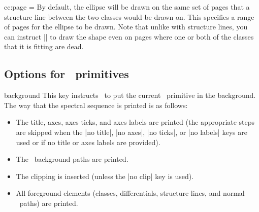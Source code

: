 \begin{sseqdata}[name = basic, cohomological Serre grading]
\begin{key}{cc:page = }%
By default, the ellipse will be drawn on the same set of pages that a structure
line between the two classes would be drawn on. This specifies a range of pages
for the ellipse to be drawn. Note that unlike with structure lines, you can
instruct |\circleclasses| to draw the shape even on pages where one or both of
the classes that it is fitting are dead.
\end{key}

\subsection{Options for \tikzpkg\  primitives}
\begin{key}{background}%
This key instructs \sseqpages\  to put the current \tikzpkg\  primitive in the
background. The way that the spectral sequence is printed is as follows:
\begin{itemize}
\item The title, axes, axes ticks, and axes labels are printed (the appropriate
steps are skipped when the |no title|, |no axes|, |no ticks|, or |no labels|
keys are used or if no title or axes labels are provided).

\item The \tikzpkg\  background paths are printed.

\item The clipping is inserted (unless the |no clip| key is used).

\item All foreground elements (classes, differentials, structure lines, and
normal \tikzpkg\  paths) are printed.
\end{itemize}


\end{key}
\end{sseqdata}
